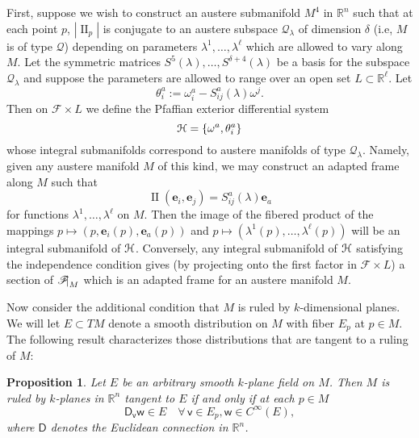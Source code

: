 \documentclass[12pt,reqno]{amsart}
\newtheorem{prop}[theorem]{Proposition}
\theoremstyle{definition}
\theoremstyle{remark}
\begin{document}
First, suppose we wish to construct an austere submanifold $M^4$ in ${\mathbb R}^n$ such that at each point $p$,
$|{\operatorname{II}}_p|$ is conjugate to an austere subspace ${\mathcal Q}_\lambda$ of dimension ${\delta}$ (i.e, $M$ is of type ${\mathcal Q}$) depending on parameters
$\lambda^1, \ldots, \lambda^\ell$ which are allowed to vary along $M$.
Let the symmetric matrices $S^5(\lambda), \ldots, S^{{\delta}+4}(\lambda)$ be a basis for
the subspace ${\mathcal Q}_{\lambda}$ and suppose the parameters are allowed to range over an open set $L \subset {\mathbb R}^\ell$. Let
\begin{equation}\label{defoftai}
\theta_i^a:=\omega^a_i - S^a_{ij}(\lambda){\omega}^j.
\end{equation}
Then on ${\mathscr F}\times L$ we define the Pfaffian exterior differential  system
$${{\EuScript H}} = \{ \omega^a, \theta^a_i\}$$
whose integral submanifolds correspond to austere manifolds of type ${\mathcal Q}_{\lambda}$.
Namely, given any austere manifold $M$ of this kind,
we may construct an adapted frame along $M$ such that
\begin{equation}\label{sis}
{\operatorname{II}}({\mathbf e}_i,{\mathbf e}_j) =S^a_{ij}(\lambda){\mathbf e}_a
\end{equation}
for functions $\lambda^1, \ldots, \lambda^\ell$ on $M$.  Then the
image of the fibered product of the mappings
$p \mapsto (p, {\mathbf e}_i(p), {\mathbf e}_a(p))$ and $p\mapsto (\lambda^1(p), \ldots, \lambda^\ell(p))$ will be an integral submanifold of ${{\EuScript H}}$.
Conversely, any integral submanifold of ${{\EuScript H}}$ satisfying the independence
condition gives (by projecting onto the first factor in ${\mathscr F}\times L$)
a section of ${\mathscr F}{\negthickspace \mid}_M$ which is an adapted frame for an austere manifold $M$.

Now consider the additional condition that $M$ is ruled by $k$-dimensional planes.
We will let $E\subset TM$ denote a smooth distribution on $M$ with fiber $E_p$
at $p\in M$.  The following result characterizes
those distributions that are tangent to a ruling of $M$:
\begin{prop} Let $E$ be an arbitrary smooth $k$-plane field on $M$.
Then $M$ is ruled by $k$-planes in ${\mathbb R}^n$ tangent to $E$ if and only if at each $p\in M$
\begin{equation}\label{Druling}
{\mathsf D}_{\mathsf v} {\mathsf w} \in E \quad \forall\, {\mathsf v}\in E_p, {\mathsf w} \in C^\infty(E),
\end{equation}
where $\mathsf D$ denotes the Euclidean connection in ${\mathbb R}^n$.
\end{prop}
\end{document}
